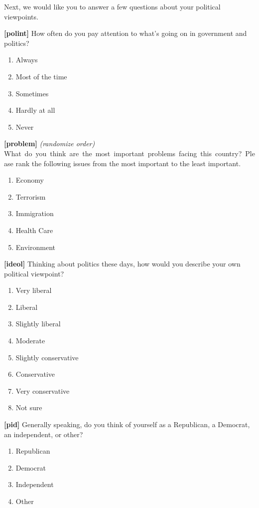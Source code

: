 \documentclass[
]{article}
\providecommand{\tightlist}{%
  \setlength{\itemsep}{0pt}\setlength{\parskip}{0pt}}
\begin{document}
Next, we would like you to answer a few questions about your political
viewpoints.

\textbf{{[}polint{]}} How often do you pay attention to what's going on
in government and politics?

\begin{enumerate}
\def\labelenumi{\arabic{enumi}.}
\tightlist
\item
  Always
\item
  Most of the time
\item
  Sometimes
\item
  Hardly at all
\item
  Never
\end{enumerate}

\textbf{{[}problem{]}} \emph{(randomize order)}
What~do~you~think~are~the~most~important~problems~facing~this~country?~Please
rank the following issues from the most important to the least
important.

\begin{enumerate}
\def\labelenumi{\arabic{enumi}.}
\tightlist
\item
  Economy
\item
  Terrorism
\item
  Immigration
\item
  Health Care
\item
  Environment
\end{enumerate}

\textbf{{[}ideol{]}} Thinking about politics these days, how would you
describe your own political viewpoint?

\begin{enumerate}
\def\labelenumi{\arabic{enumi}.}
\tightlist
\item
  Very liberal
\item
  Liberal
\item
  Slightly liberal
\item
  Moderate
\item
  Slightly conservative
\item
  Conservative
\item
  Very conservative
\item
  Not sure
\end{enumerate}

\textbf{{[}pid{]}} Generally speaking, do you think of yourself as a
Republican, a Democrat, an independent, or other?

\begin{enumerate}
\def\labelenumi{\arabic{enumi}.}
\tightlist
\item
  Republican
\item
  Democrat
\item
  Independent
\item
  Other
\end{enumerate}
\end{document}
